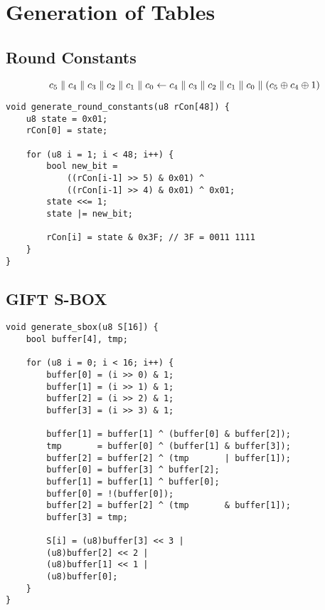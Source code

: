 \chapter{Generation of Tables}

\section{Round Constants}
\begin{note}[LFSR]
	\[
	c_5\parallel c_4\parallel c_3\parallel c_2\parallel c_1\parallel c_0\gets
	c_4\parallel c_3\parallel c_2\parallel c_1\parallel c_0\parallel (c_5\oplus c_4\oplus 1)
	\]
\end{note}
\begin{lstlisting}[style=C]
void generate_round_constants(u8 rCon[48]) {
	u8 state = 0x01;
	rCon[0] = state;
	
	for (u8 i = 1; i < 48; i++) {
		bool new_bit = 
			((rCon[i-1] >> 5) & 0x01) ^
			((rCon[i-1] >> 4) & 0x01) ^ 0x01;
		state <<= 1;
		state |= new_bit;
		
		rCon[i] = state & 0x3F; // 3F = 0011 1111
	}
}
\end{lstlisting}

\newpage
\section{GIFT S-BOX}
\begin{lstlisting}[style=C]
void generate_sbox(u8 S[16]) {
	bool buffer[4], tmp;
	
	for (u8 i = 0; i < 16; i++) {
		buffer[0] = (i >> 0) & 1;
		buffer[1] = (i >> 1) & 1;
		buffer[2] = (i >> 2) & 1;
		buffer[3] = (i >> 3) & 1;
		
		buffer[1] = buffer[1] ^ (buffer[0] & buffer[2]);
		tmp       = buffer[0] ^ (buffer[1] & buffer[3]);
		buffer[2] = buffer[2] ^ (tmp       | buffer[1]);
		buffer[0] = buffer[3] ^ buffer[2];
		buffer[1] = buffer[1] ^ buffer[0];
		buffer[0] = !(buffer[0]);
		buffer[2] = buffer[2] ^ (tmp       & buffer[1]);
		buffer[3] = tmp;
		
		S[i] = (u8)buffer[3] << 3 |
		(u8)buffer[2] << 2 |
		(u8)buffer[1] << 1 |
		(u8)buffer[0];
	}
}
\end{lstlisting}


